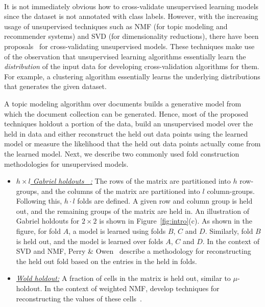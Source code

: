 \documentclass{vldb}
\newcommand{\topic}[1]{\par \smallskip \smallskip \noindent{\bf \uline{#1}}}
\begin{document}
\topic{Unsupervised learning:}\\
It is not immediately obvious how to cross-validate unsupervised learning models
since the dataset is not annotated with class labels.
However, with the increasing usage of unsupervised techniques
such as NMF (for topic modeling and recommender systems) and SVD
(for dimensionality reductions), there have been proposals~\cite{nips2010,PerryO09}
for cross-validating unsupervised models.
These techniques make use of the observation that unsupervised learning
algorithms essentially learn the {\em distribution} of the input data for
developing cross-validation algorithms for them. For example, a clustering
algorithm essentially learns the underlying distributions that generates the
given dataset.


A topic modeling algorithm over documents builds a generative model
from which the document collection can be generated.
Hence, most of the proposed techniques holdout a portion of the data,
build an unsupervised model over the held in data and
either reconstruct the held out data points using the learned model or measure the
likelihood that the held out data points actually come from the learned model.
Next, we describe two commonly used fold construction methodologies for
unsupervised models.

\begin{itemize}
\item \underline{\em $h\times l$ Gabriel holdouts ~\cite{gabriel}:}
The rows of the matrix are partitioned into $h$ row-groups,
and the columns of the matrix are partitioned into $l$ column-groups.
Following this, $h \cdot l$ folds are defined. A given row and column group is
held out, and the remaining groups of the matrix are held in.
An illustration of Gabriel holdouts for $2\times 2$ is shown in
Figure~\ref{fig:intro}(c). As shown in the figure, for fold $A$,
a model is learned using folds $B$, $C$ and $D$. Similarly,
fold $B$ is held out, and the model is learned over folds $A$, $C$ and $D$.
In the context of SVD and NMF, Perry \& Owen~\cite{PerryO09} describe a methodology for reconstructing the held out fold based on the entries in the held in folds.

\item \underline{\em Wold holdout:} A fraction of cells in the matrix is
held out, similar to $\mu$-holdout. In the context of weighted NMF, \cite{nips2010}
develop techniques for reconstructing the values of these cells~\cite{DBLP:conf/icml/SrebroJ03}.
\end{itemize}
\end{document}

